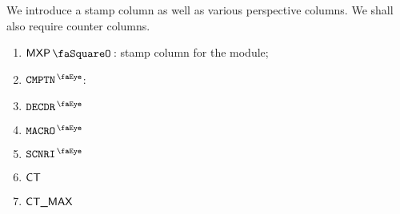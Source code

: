We introduce a stamp column as well as various perspective columns.
We shall also require counter columns.
\begin{enumerate}
	\item $\mxpStamp$:
		stamp column for the \mxpMod{} module;
	\item $\isMxpComputationColumn$:

	\item $\isMxpInstructionDecoderColumn$
	\item $\isMxpMacroColumn$
	\item $\isMxpScenarioColumn$
        \item $\textsf{CT}$
        \item $\textsf{CT\_MAX}$
\end{enumerate}
